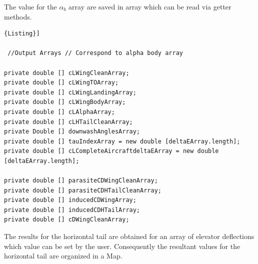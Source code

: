 The value for the $\alpha_b$ array are saved in array which can be read via getter methods.

\begin{lstlisting}[frame=rbl,caption={{\footnotesize Some of Output Array}},label= [style=\bfseries]{Listing}]

 //Output Arrays // Correspond to alpha body array
 
private double [] cLWingCleanArray;
private double [] cLWingTOArray;
private double [] cLWingLandingArray;
private double [] cLWingBodyArray;
private double [] cLAlphaArray;
private double [] cLHTailCleanArray;
private Double [] downwashAnglesArray;
private double [] tauIndexArray = new double [deltaEArray.length];
private double [] cLCompleteAircraftdeltaEArray = new double [deltaEArray.length];

private double [] parasiteCDWingCleanArray;
private double [] parasiteCDHTailCleanArray;
private double [] inducedCDWingArray;
private double [] inducedCDHTailArray;
private double [] cDWingCleanArray;
\end{lstlisting}


The results for the horizontal tail are obtained for an array of elevator deflections which value can be set by the user. Consequently the resultant values for the horizontal tail are organized in a Map.


%

